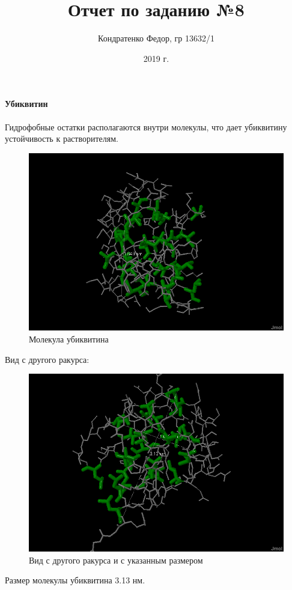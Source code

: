 \documentclass{article}
\date{2019 г.}
\author{Кондратенко Федор, гр 13632/1}
\title{Отчет по заданию №8}
\begin{document}
	\maketitle
	\paragraph*{Убиквитин\\}
	Гидрофобные остатки располагаются внутри молекулы, что дает убиквитину устойчивость к растворителям.\\
	\begin{figure}[H]
		\centering
		\includegraphics[width=0.7\linewidth]{ubi}
		\caption{Молекула убиквитина}
		\label{fig:ubi}
	\end{figure}
	
	Вид с другого ракурса:
	\begin{figure}[H]
		\centering
		\includegraphics[width=0.7\linewidth]{ubi2}
		\caption{Вид с другого ракурса и с указанным размером}
		\label{fig:ubi2}
	\end{figure}
	Размер молекулы убиквитина 3.13 нм.
\end{document}
